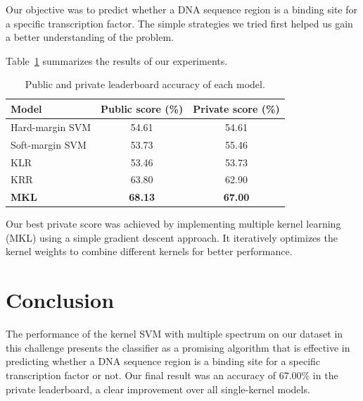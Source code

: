 \documentclass[times,5p, twocolumn]{elsarticle}
\begin{document}
Our objective was to predict whether a DNA sequence region is a binding site for a specific transcription factor. The simple strategies we tried first helped us gain a better understanding of the problem.

Table~\ref{tab:table1} summarizes the results of our experiments.


\begin{table}[h!]
  \begin{center}
    \caption{Public and private leaderboard accuracy of each model.}
    \label{tab:table1}
    \begin{tabular}{l|c|c}
      \textbf{Model} & \textbf{Public score (\%)} & \textbf{Private score (\%)}\\
      \hline
      Hard-margin SVM & 54.61 & 54.61\\
      Soft-margin SVM & 53.73 & 55.46\\
      KLR & 53.46 & 53.73\\
      KRR & 63.80 & 62.90\\
      \textbf{MKL }& \textbf{68.13} & \textbf{67.00}\\
    \end{tabular}
  \end{center}
\end{table}

Our best private score was achieved by implementing multiple kernel learning (MKL) using a simple gradient descent approach. It iteratively optimizes the kernel weights to combine different kernels for better performance.



\section{Conclusion}

The performance of the kernel SVM with multiple spectrum on our dataset in this challenge presents the classifier as a promising algorithm that is effective in predicting whether a DNA sequence region is a binding site for a specific transcription factor or not. Our final result was an accuracy of 67.00\% in the private leaderboard, a clear improvement over all single-kernel models.
\end{document}
